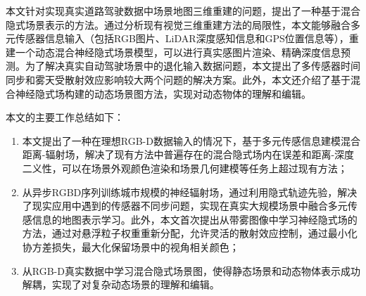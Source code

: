%
%
%
%
%
%

\begin{conclusion}

  本文针对实现真实道路驾驶数据中场景地图三维重建的问题，提出了一种基于混合隐式场景表示的方法。通过分析现有视觉三维重建方法的局限性，本文能够融合多元传感器信息输入（包括RGB图片、LiDAR深度感知信息和GPS位置信息等），重建一个动态混合神经隐式场景模型，可以进行真实感图片渲染、精确深度信息预测。为了解决真实自动驾驶场景中的退化输入数据问题，本文提出了多传感器时间同步和雾天受散射效应影响较大两个问题的解决方案。此外，本文还介绍了基于混合神经隐式场构建的动态场景图方法，实现对动态物体的理解和编辑。

本文的主要工作总结如下：
\begin{enumerate}
    \item 本文提出了一种在理想RGB-D数据输入的情况下，基于多元传感信息建模混合距离-辐射场，解决了现有方法中普遍存在的混合隐式场内在误差和距离-深度二义性，可以在场景外观颜色渲染和场景几何建模等任务上超过现有方法；
    \item 从异步RGBD序列训练城市规模的神经辐射场，通过利用隐式轨迹先验，解决了现实应用中遇到的传感器不同步问题，实现在真实大规模场景中融合多元传感信息的地图表示学习。此外，本文首次提出从带雾图像中学习神经隐式场的方法，通过对悬浮粒子权重重新分配，允许灵活的散射效应控制，通过最小化协方差损失，最大化保留场景中的视角相关颜色；
    \item 从RGB-D真实数据中学习混合隐式场景图，使得静态场景和动态物体表示成功解耦，实现了对复杂动态场景的理解和编辑。
\end{enumerate}


\end{conclusion}
